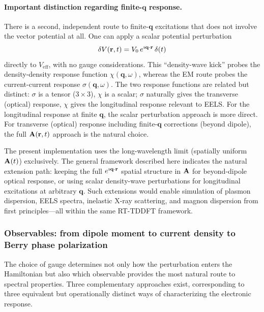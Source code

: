 \paragraph{Important distinction regarding finite-$\mathbf{q}$
response.}
There is a second, independent route to finite-$\mathbf{q}$
excitations that does not involve the vector potential at all.
One can apply a scalar potential perturbation
\begin{equation}
  \delta V(\mathbf{r},t)
  = V_0\,e^{\imath\mathbf{q}\cdot\mathbf{r}}\,\delta(t)
  \label{eq:density-wave-kick}
\end{equation}
directly to $V_\text{eff}$, with no gauge considerations.
This ``density-wave kick'' probes the density-density response
function $\chi(\mathbf{q},\omega)$, whereas the EM route probes the
current-current response $\sigma(\mathbf{q},\omega)$.
The two response functions are related but distinct:
$\sigma$ is a tensor ($3\times3$), $\chi$ is a scalar;
$\sigma$ naturally gives the transverse (optical) response,
$\chi$ gives the longitudinal response relevant to EELS.
For the longitudinal response at finite $\mathbf{q}$, the scalar
perturbation approach is more direct.
For transverse (optical) response including finite-$\mathbf{q}$
corrections (beyond dipole), the full
$\mathbf{A}(\mathbf{r},t)$ approach is the natural choice.

The present implementation uses the long-wavelength limit
(spatially uniform $\mathbf{A}(t)$) exclusively.
The general framework described here indicates the natural extension
path: keeping the full $e^{\imath\mathbf{q}\cdot\mathbf{r}}$
spatial structure in $\mathbf{A}$ for beyond-dipole optical response, or
using scalar density-wave perturbations for longitudinal excitations
at arbitrary $\mathbf{q}$.
Such extensions would enable simulation of plasmon dispersion, EELS
spectra, inelastic X-ray scattering, and magnon dispersion from
first principles---all within the same RT-TDDFT framework.


\subsubsection{Observables: from dipole moment to current density to
               Berry phase polarization}
\label{sec:observables-berry}

The choice of gauge determines not only how the perturbation enters
the Hamiltonian but also which observable provides the most natural
route to spectral properties.
Three complementary approaches exist, corresponding to three
equivalent but operationally distinct ways of characterizing the
electronic response.

